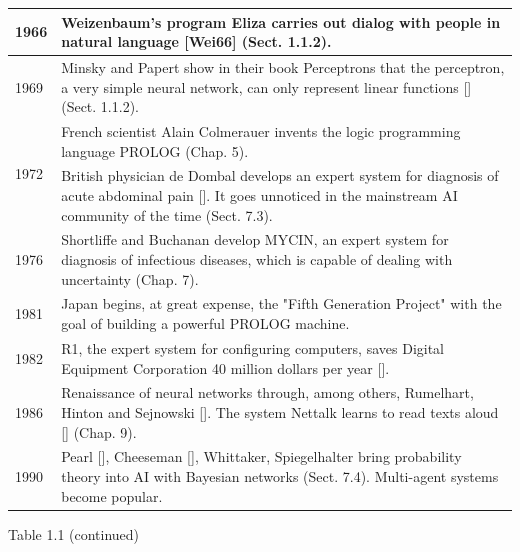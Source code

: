 \documentclass[10pt]{article}
\begin{document}
\begin{center}
\begin{tabular}{|l|l|}
\hline
1966 & Weizenbaum's program Eliza carries out dialog with people in natural language [Wei66] (Sect. 1.1.2). \\
\hline
1969 & Minsky and Papert show in their book Perceptrons that the perceptron, a very simple neural network, can only represent linear functions [\cite{minsky1969perceptrons}] (Sect. 1.1.2). \\
\hline
\multirow[t]{2}{*}{1972} & French scientist Alain Colmerauer invents the logic programming language PROLOG (Chap. 5). \\
\hline
 & British physician de Dombal develops an expert system for diagnosis of acute abdominal pain [\cite{dedombal1972computer}]. It goes unnoticed in the mainstream AI community of the time (Sect. 7.3). \\
\hline
1976 & Shortliffe and Buchanan develop MYCIN, an expert system for diagnosis of infectious diseases, which is capable of dealing with uncertainty (Chap. 7). \\
\hline
1981 & Japan begins, at great expense, the "Fifth Generation Project" with the goal of building a powerful PROLOG machine. \\
\hline
1982 & R1, the expert system for configuring computers, saves Digital Equipment Corporation 40 million dollars per year [\cite{mcdermott1982r1}]. \\
\hline
1986 & Renaissance of neural networks through, among others, Rumelhart, Hinton and Sejnowski [\cite{rumelhart1986pdp}]. The system Nettalk learns to read texts aloud [\cite{sejnowski1986nettalk}] (Chap. 9). \\
\hline
1990 & Pearl [\cite{pearl1988probabilistic}], Cheeseman [\cite{cheeseman1985defense}], Whittaker, Spiegelhalter bring probability theory into AI with Bayesian networks (Sect. 7.4). Multi-agent systems become popular. \\
\hline
\end{tabular}
\end{center}

Table 1.1 (continued)
\end{document}
